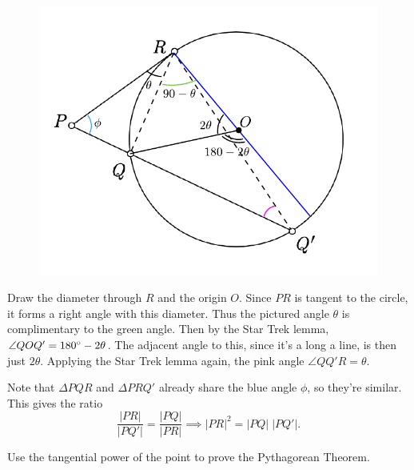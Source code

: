 \documentclass[twoside,10pt]{article}
\begin{document}
\begin{figure}[H]
	\centering
	\includegraphics[scale=0.7]{fig/53.pdf}
\end{figure}

Draw the diameter through $R$ and the origin $O$. Since $PR$ is tangent to the circle, it forms a right angle with this diameter. Thus the pictured angle $\theta$ is complimentary to the green angle. Then by the Star Trek lemma, $\angle QOQ' = 180^\circ -2\theta$. The adjacent angle to this, since it's a long a line, is then just $2\theta$. Applying the Star Trek lemma again, the pink angle $\angle QQ'R = \theta$.

Note that $\Delta PQR$ and $\Delta PRQ'$ already share the blue angle $\phi$, so they're similar. This gives the ratio
\[
\frac{|PR|}{|PQ'|} = \frac{|PQ|}{|PR|} \implies |PR|^2 = |PQ| \; |PQ'|.
\] 

\newpage

\begin{exer}[1.54]
	Use the tangential power of the point to prove the Pythagorean Theorem.
\end{exer}
\end{document}
